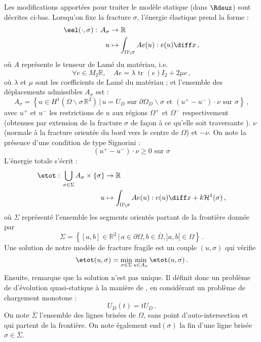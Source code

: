 Les modifications apportées pour traiter le modèle statique (dans $\Rdeux$) sont décrites ci-bas. Lorsqu'on fixe la fracture $\sigma$, l'énergie élastique prend la forme :
\begin{align*}
\eel (\cdot,\sigma): \, A_{\sigma} &\rightarrow \mathbb{R} \\
u &\mapsto \int_{\Omega \backslash \sigma} Ae(u) : e(u) \diff x \,,
\end{align*}
où $A$ représente le tenseur de Lamé du matériau, i.e.
$$
    \forall e \in M_2{\mathbb{R}}, \quad Ae = \lambda \text{ tr }(e)I_2 + 2\mu e \,,
$$ 
où $\lambda$ et $\mu$ sont les coefficients de Lamé du matériau ; et l'ensemble des déplacements admissibles $A_{\sigma}$ est :
$$
A_{\sigma} = \left\{  u \in H^1(\Omega \backslash \sigma \, \mathbb{R}^2) \, \rvert \, u=U_D \text{ sur } \partial \Omega_D \backslash \sigma \text{ et } (u^+ - u^{-}) \cdot \nu \text{ sur } \sigma \right\} \,,
$$
avec $u^{+}$ et $u^{−}$ les restrictions de $u$ aux régions $\Omega^{+}$ et $\Omega^{-}$ respectivement (obtenues par extension de la fracture $\sigma$ de façon à ce qu'elle soit traversante \parencite[p.52]{balasoiu2020halthesis}). $\nu$ (normale à la fracture orientée du bord vers le centre de $\Omega$) et $−\nu$. On note la présence d'une condition de type Signorini :
$$
(u^+ - u^{-}) \cdot \nu \geq 0 \text{  sur  } \sigma
$$
L'énergie totale s'écrit :
\begin{align*}
\etot : \,\bigcup_{\sigma \in \Sigma } A_{\sigma} \times \left\{ \sigma \right\} &\rightarrow \mathbb{R} \\
 u &\mapsto \int_{\Omega \backslash \sigma} Ae(u) : e(u) \diff x + k\mathcal{H}^1(\sigma)\,,
\end{align*}
où $\Sigma$ représenté l'ensemble les segments orientés partant de la frontière donnée par 
$$
\Sigma = \left\{ [a,b] \in \mathbb{R}^2 \, \lvert \, a \in \partial\Omega, b\in \overline{\Omega}, ]a,b[ \in \Omega\right\} \,.
$$
Une solution de notre modèle de fracture fragile est un couple $(u, \sigma)$ qui vérifie
$$
\etot(u,\sigma) = \min_{\sigma \in \Sigma}{\min_{u\in A_{\sigma}}{\etot(u,\sigma)}} \,.
$$
Ensuite, \citeauthor{balasoiu2020halthesis} remarque que la solution n'est pas unique. Il définit donc un problème de d'évolution quasi-statique à la manière de \parencite{francfort1998revisiting}, en considérant un problème de chargement monotone : 
$$
U_D(t) = tU_D \,.
$$
On note $\overline{\Sigma}$ l’ensemble des lignes brisées de $\Omega$, sans point d’auto-intersection et qui partent de la frontière. On note également $\text{end}(\sigma)$ la fin d’une ligne brisée $\sigma \in  \overline{\Sigma}$.
